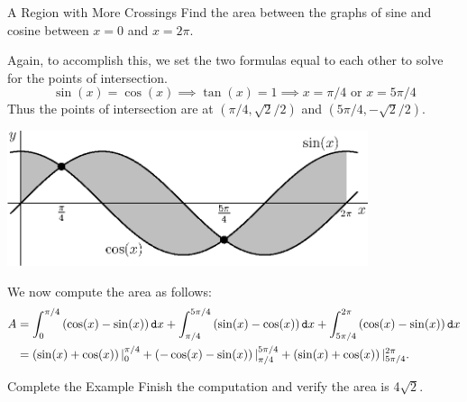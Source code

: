\begin{example}{A Region with More Crossings}
 Find the area between the graphs of sine and cosine between $x=0$ and $x=2\pi$.

Again, to accomplish this, we set the two formulas equal to each other to solve for the points of intersection.  $$\sin(x)=\cos(x) \implies \tan(x)=1 \implies x=\pi/4  \text{ or }  x=5\pi/4$$ 
Thus the points of intersection are at $\left(\pi/4,\sqrt{2}/2\right)$ and $\left(5\pi/4,-\sqrt{2}/2\right)$. 

	\begin{center}
\includegraphics[width=300pt]{ChapterGeom/Figures/areabtsincos.eps}
	\end{center}

We now compute the area as follows: \begin{align*}
A&=\int_0^{\pi/4} \left(\cos(x)-\sin(x)\right) \mathop{}\!\mathtt{d} x+\int_{\pi/4}^{5\pi/4} \left(\sin(x)-\cos(x)\right) \mathop{}\!\mathtt{d} x+\int_{5\pi/4}^{2\pi} \left(\cos(x)-\sin(x)\right) \mathop{}\!\mathtt{d} x \\
&=\left(\sin(x)+\cos(x)\right)|_0^{\pi/4} +\left(-\cos(x)-\sin(x)\right)|_{\pi/4}^{5\pi/4} +\left(\sin(x)+\cos(x)\right)|_{5\pi/4}^{2\pi}. 
\end{align*}

\end{example}
\begin{exercise}{Complete the Example \Coffeecup \Coffeecup }
Finish the computation and verify the area is 4$\sqrt{2}$.
\end{exercise}

